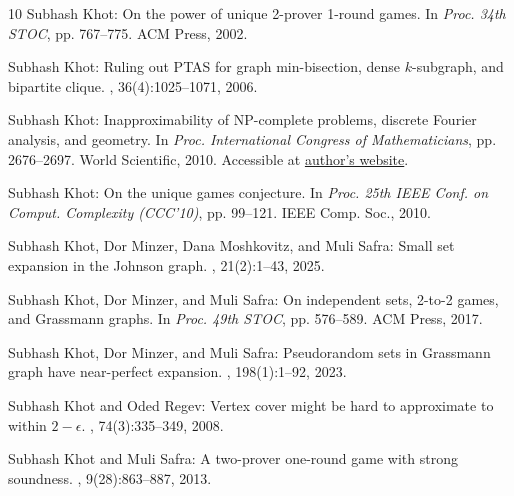 \documentclass[11pt]{article}
\numberwithin{equation}{section}
\theoremstyle{definition}
\theoremstyle{plain}
\begin{document}
\begin{thebibliography}{10}
{\sc Subhash Khot}: On the power of unique 2-prover 1-round games.
\newblock In {\em Proc. 34th STOC}, pp. 767--775. ACM Press, 2002.
\newblock [\epfmtdoi{10.1145/509907.510017}]

{\sc Subhash Khot}: Ruling out {PTAS} for graph min-bisection, dense
  $k$-subgraph, and bipartite clique.
, 36(4):1025--1071, 2006.
\newblock [\epfmtdoi{10.1137/S0097539705447037}]

{\sc Subhash Khot}: Inapproximability of {NP}-complete problems, discrete
  {F}ourier analysis, and geometry.
\newblock In {\em Proc. International Congress of Mathematicians}, pp.
  2676--2697. World Scientific, 2010.
\newblock Accessible at
  \href{https://cs.nyu.edu/~khot/papers/icm-khot.pdf}{author's website}.
\newblock [\epfmtdoi{10.1142/9789814324359\_0163}]

{\sc Subhash Khot}: On the unique games conjecture.
\newblock In {\em Proc. 25th IEEE Conf. on Comput. Complexity (CCC'10)}, pp.
  99--121. IEEE Comp. Soc., 2010.

{\sc Subhash Khot, Dor Minzer, Dana Moshkovitz, and Muli Safra}: Small set
  expansion in the {J}ohnson graph.
, 21(2):1--43, 2025.

{\sc Subhash Khot, Dor Minzer, and Muli Safra}: On independent sets, 2-to-2
  games, and {G}rassmann graphs.
\newblock In {\em Proc. 49th STOC}, pp. 576--589. ACM Press, 2017.
\newblock [\epfmtdoi{10.1145/3055399.3055432}]

{\sc Subhash Khot, Dor Minzer, and Muli Safra}: Pseudorandom sets in
  {G}rassmann graph have near-perfect expansion.
, 198(1):1--92, 2023.

{\sc Subhash Khot and Oded Regev}: Vertex cover might be hard to approximate to
  within $2-\epsilon$.
, 74(3):335--349, 2008.

{\sc Subhash Khot and Muli Safra}: A two-prover one-round game with strong
  soundness.
, 9(28):863--887, 2013.


\end{thebibliography}
\end{document}
